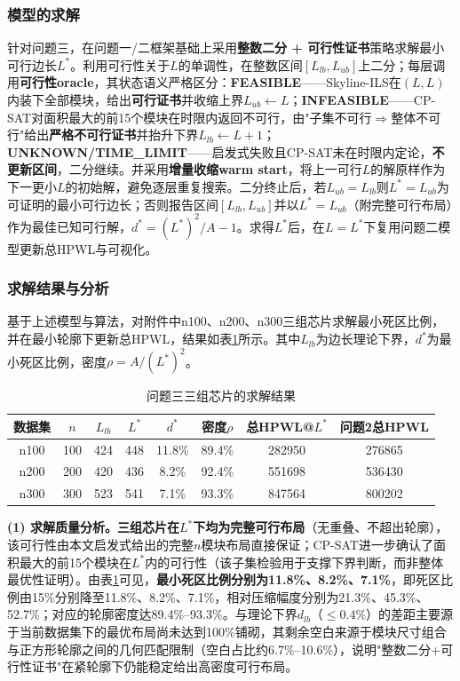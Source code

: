 \documentclass{JXUSTmodeling}
\begin{document}
\subsubsection{模型的求解}
针对问题三，在问题一/二框架基础上采用\textbf{整数二分 + 可行性证书}策略求解最小可行边长$L^{*}$。利用可行性关于$L$的单调性，在整数区间$[L_{lb},L_{ub}]$上二分；每层调用\textbf{可行性oracle}，其状态语义严格区分：\textbf{FEASIBLE}——Skyline-ILS在$(L,L)$内装下全部模块，给出\textbf{可行证书}并收缩上界$L_{ub}\leftarrow L$；\textbf{INFEASIBLE}——CP-SAT对面积最大的前15个模块在时限内返回不可行，由"子集不可行$\Rightarrow$整体不可行"给出\textbf{严格不可行证书}并抬升下界$L_{lb}\leftarrow L+1$；\textbf{UNKNOWN/TIME\_LIMIT}——启发式失败且CP-SAT未在时限内定论，\textbf{不更新区间}，二分继续。并采用\textbf{增量收缩warm start}，将上一可行$L$的解原样作为下一更小$L$的初始解，避免逐层重复搜索。二分终止后，若$L_{ub}=L_{lb}$则$L^{*}=L_{ub}$为可证明的最小可行边长；否则报告区间$[L_{lb},L_{ub}]$并以$L^{*}=L_{ub}$（附完整可行布局）作为最佳已知可行解，$d^{*}=(L^{*})^2/A-1$。求得$L^{*}$后，在$L=L^{*}$下复用问题二模型更新总HPWL与可视化。

\subsubsection{求解结果与分析}
基于上述模型与算法，对附件中n100、n200、n300三组芯片求解最小死区比例，并在最小轮廓下更新总HPWL，结果如表\ref{tab:p3_result}所示。其中$L_{lb}$为边长理论下界，$d^{*}$为最小死区比例，密度$\rho=A/(L^{*})^2$。

\begin{table}[!htbp]
	\centering
	\caption{\label{tab:p3_result}问题三三组芯片的求解结果}
	\begin{tabular}{cccccccc}
		\toprule[1.5pt]
		数据集&$n$&$L_{lb}$&$L^{*}$&$d^{*}$&密度$\rho$&总HPWL@$L^{*}$&问题2总HPWL\\
		\midrule
		n100&100&424&448&11.8\%&89.4\%&282950&276865\\
		n200&200&420&436&8.2\%&92.4\%&551698&536430\\
		n300&300&523&541&7.1\%&93.3\%&847564&800202\\
		\bottomrule[1.5pt]
	\end{tabular}
\end{table}

\textbf{(1) 求解质量分析。}\textbf{三组芯片在$L^{*}$下均为完整可行布局}（无重叠、不超出轮廓），该可行性由本文启发式给出的完整$n$模块布局直接保证；CP-SAT进一步确认了面积最大的前15个模块在$L^{*}$内的可行性（该子集检验用于支撑下界判断，而非整体最优性证明）。由表\ref{tab:p3_result}可见，\textbf{最小死区比例分别为11.8\%、8.2\%、7.1\%}，即死区比例由15\%分别降至11.8\%、8.2\%、7.1\%，相对压缩幅度分别为21.3\%、45.3\%、52.7\%；对应的轮廓密度达89.4\%--93.3\%。与理论下界$d_{lb}$（$\le0.4\%$）的差距主要源于当前数据集下的最优布局尚未达到100\%铺砌，其剩余空白来源于模块尺寸组合与正方形轮廓之间的几何匹配限制（空白占比约6.7\%--10.6\%），说明"整数二分+可行性证书"在紧轮廓下仍能稳定给出高密度可行布局。
\end{document}
